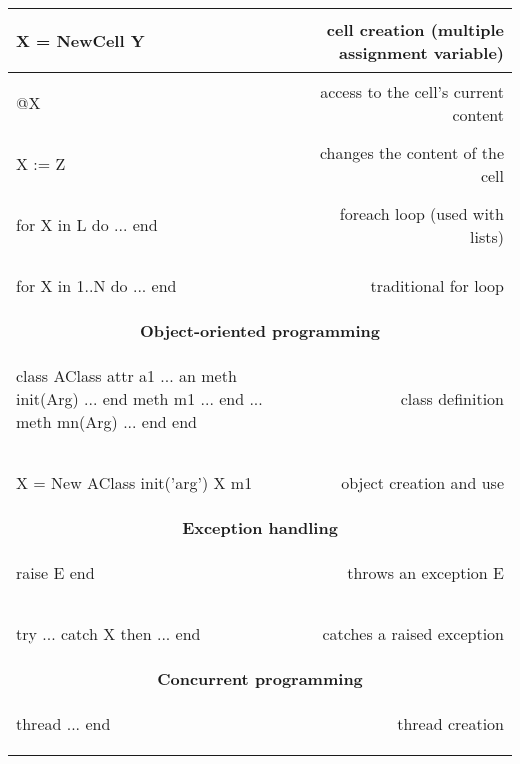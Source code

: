 \documentclass[12pt]{article}
\begin{document}
\begin{longtable}{l r}
\begin{oz}
X = {NewCell Y}
\end{oz}
&cell creation (multiple assignment variable) \\
\hline

\begin{oz}
@X
\end{oz}
& access to the cell's current content\\
\hline

\begin{oz}
X := Z
\end{oz}
&changes the content of the cell \\
\hline

\begin{oz}
for X in L do 
  ...
end
\end{oz}
&foreach loop (used with lists)\\
\hline

\begin{oz}
for X in 1..N do 
  ...
end
\end{oz}
&traditional for loop \\[0.4em]



\midrule[0.3mm]
\multicolumn{2}{c}{\textbf{Object-oriented programming}}\\
\midrule[0.3mm]



\begin{oz}
class AClass
	attr a1 ... an
	meth init(Arg) ... end
	meth m1 ... end
		...
	meth mn(Arg) ... end
end
\end{oz}
&class definition\\
\hline

\begin{oz}
X = {New AClass init('arg')}
{X m1}
\end{oz}
&object creation and use\\[0.4em]



\midrule[0.3mm]
\multicolumn{2}{c}{\textbf{Exception handling}}\\
\midrule[0.3mm]



\begin{oz}
raise E end
\end{oz}
&throws an exception E \\
\hline

\begin{oz}
try ... catch X then ... end
\end{oz}
&catches a raised exception\\[0.4em]



\midrule[0.3mm]
\multicolumn{2}{c}{\textbf{Concurrent programming}}\\
\midrule[0.3mm]



\begin{oz}
thread ... end
\end{oz}
&thread creation\\


\end{longtable}
\end{document}
